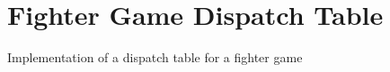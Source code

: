 \chapter{Fighter Game Dispatch Table}
\hypertarget{index}{}\label{index}
Implementation of a dispatch table for a fighter game 